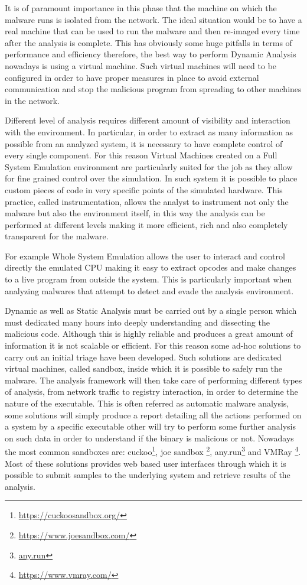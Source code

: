It is of paramount importance in this phase that the machine on which the malware runs is isolated from the network. The ideal situation would be to have a real machine that can be used to run the malware and then re-imaged every time after the analysis is complete. This has obviously some huge pitfalls in terms of performance and efficiency therefore, the best way to perform Dynamic Analysis nowadays is using a virtual machine. Such virtual machines will need to be configured in order to have proper measures in place to avoid external communication and stop the malicious program from spreading to other machines in the network. 

Different level of analysis requires different amount of visibility and interaction with the environment. In particular, in order to extract as many information as possible from an analyzed system, it is necessary to have complete control of every single component. For this reason Virtual Machines created on a Full System Emulation environment are particularly suited for the job as they allow for fine grained control over the simulation. In such system it is possible to place custom pieces of code in very specific points of the simulated hardware. This practice, called instrumentation, allows the analyst to instrument not only the malware but also the environment itself, in this way the analysis can be performed at different levels making it more efficient, rich and also completely transparent for the malware.

For example Whole System Emulation allows the user to interact and control directly the emulated CPU making it easy to extract opcodes and make changes to a live program from outside the system. This is particularly important when analyzing malwares that attempt to detect and evade the analysis environment. 

Dynamic as well as Static Analysis must be carried out by a single person which must dedicated many hours into deeply understanding and dissecting the malicious code. Although this is highly reliable and produces a great amount of information it is not scalable or efficient. For this reason some ad-hoc solutions to carry out an initial triage have been developed. Such solutions are dedicated virtual machines, called sandbox, inside which it is possible to safely run the malware. The analysis framework will then take care of performing different types of analysis, from network traffic to registry interaction, in order to determine the nature of the executable. This is often referred as automatic malware analysis, some solutions will simply produce a report detailing all the actions performed on a system by a specific executable other will try to perform some further analysis on such data in order to understand if the binary is malicious or not. Nowadays the most common sandboxes are: cuckoo\footnote{\url{https://cuckoosandbox.org/}}, joe sandbox \footnote{\url{https://www.joesandbox.com/}}, any.run\footnote{\url{any.run}} and VMRay \footnote{\url{https://www.vmray.com/}}. Most of these solutions provides web based user interfaces through which it is possible to submit samples to the underlying system and retrieve results of the analysis. 

